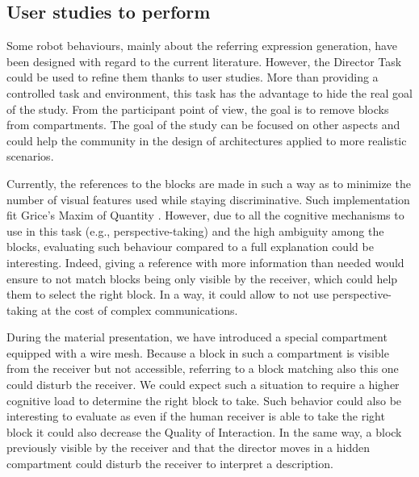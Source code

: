\subsection{User studies to perform}

Some robot behaviours, mainly about the referring expression generation, have been designed with regard to the current literature. However, the Director Task could be used to refine them thanks to user studies. More than providing a controlled task and environment, this task has the advantage to hide the real goal of the study. From the participant point of view, the goal is to remove blocks from compartments. The goal of the study can be focused on other aspects and could help the community in the design of architectures applied to more realistic scenarios.

Currently, the references to the blocks are made in such a way as to minimize the number of visual features used while staying discriminative. Such implementation fit Grice's Maxim of Quantity \cite{grice_1975_logic}. However, due to all the cognitive mechanisms to use in this task (e.g., perspective-taking) and the high ambiguity among the blocks, evaluating such behaviour compared to a full explanation could be interesting. Indeed, giving a reference with more information than needed would ensure to not match blocks being only visible by the receiver, which could help them to select the right block. In a way, it could allow to not use perspective-taking at the cost of complex communications.

During the material presentation, we have introduced a special compartment equipped with a wire mesh. Because a block in such a compartment is visible from the receiver but not accessible, referring to a block matching also this one could disturb the receiver. We could expect such a situation to require a higher cognitive load to determine the right block to take. Such behavior could also be interesting to evaluate as even if the human receiver is able to take the right block it could also decrease the Quality of Interaction. In the same way, a block previously visible by the receiver and that the director moves in a hidden compartment could disturb the receiver to interpret a description.